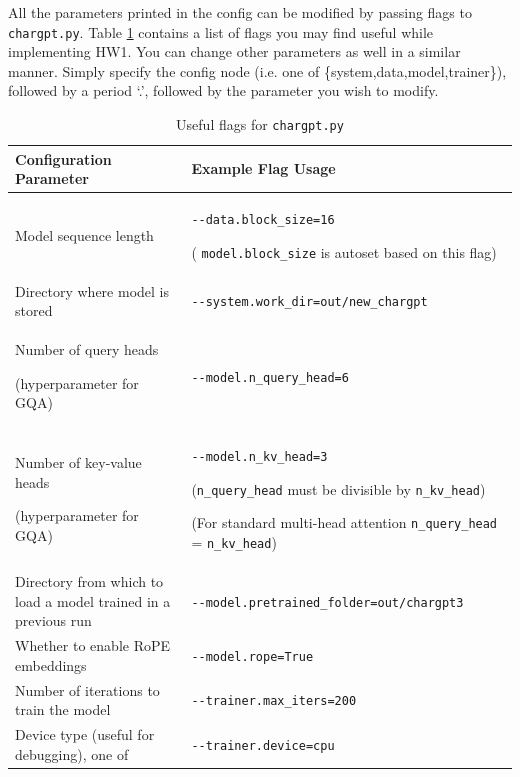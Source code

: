 \documentclass[11pt,addpoints,answers]{exam}
\begin{document}
\begin{questions}
All the parameters printed in the config can be modified by passing flags to \lstinline{chargpt.py}. Table \ref{table:flag} contains a list of flags you may find useful while implementing HW1. You can change other parameters as well in a similar manner. Simply specify the config node (i.e. one of \{system,data,model,trainer\}), followed by a period `.', followed by the parameter you wish to modify.

\begin{table}[h!]
\centering
\begin{tabular}{|p{0.35\linewidth}|p{0.65\linewidth}|}
\hline
Configuration Parameter & Example Flag Usage \\ \hline
Model sequence length &  \lstinline|--data.block_size=16|

( \lstinline|model.block_size| is autoset based on this flag) \\ \hline
Directory where model is stored &  \lstinline|--system.work_dir=out/new_chargpt| \\ \hline
Number of query heads 

(hyperparameter for GQA) &  \lstinline|--model.n_query_head=6| \\ \hline
Number of key-value heads 

(hyperparameter for GQA) &  \lstinline|--model.n_kv_head=3| 

(\lstinline|n_query_head| must be divisible by \lstinline|n_kv_head|) 

(For standard multi-head attention \lstinline|n_query_head| = \lstinline|n_kv_head|)\\ \hline
Directory from which to load a model trained in a previous run &  \lstinline|--model.pretrained_folder=out/chargpt3| \\ \hline
Whether to enable RoPE embeddings &  \lstinline|--model.rope=True| \\ \hline
Number of iterations to train the model & \lstinline|--trainer.max_iters=200| \\ \hline
Device type (useful for debugging), one of  & \lstinline|--trainer.device=cpu| \\ \hline
\end{tabular}
\caption{Useful flags for \lstinline{chargpt.py}}
\label{table:flag}
\end{table}


\end{questions}
\end{document}
